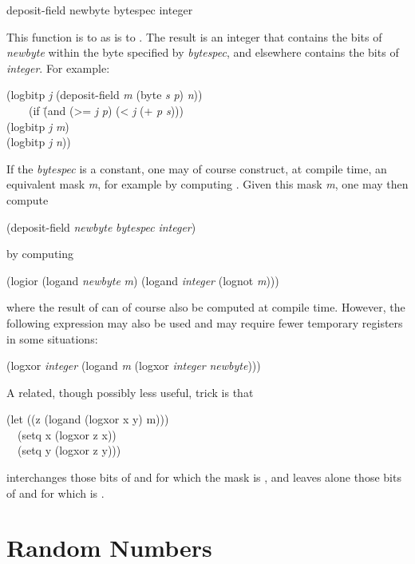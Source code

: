 \begin{defun}[Function]
deposit-field newbyte bytespec integer

This function is to  as  is to .
The result is an integer that contains the bits of {\it newbyte}
within the byte specified by {\it bytespec}, and elsewhere contains the bits
of {\it integer}.
For example:
\begin{lisp}
(logbitp {\it j} (deposit-field {\it m} (byte {\it s} {\it p}) {\it n})) \\
~~~\EQ\ (if \=(and (>= {\it j} {\it p}) (< {\it j} (+ {\it p} {\it s}))) \\
\>(logbitp {\it j} {\it m}) \\
\>(logbitp {\it j} {\it n}))
\end{lisp}

\beforenoterule
\begin{implementation}
If the {\it bytespec} is a constant, one may of course
construct, at compile time, an equivalent mask {\it m}, for example
by computing .  Given
this mask {\it m}, one may then compute
\begin{lisp}
(deposit-field {\it newbyte} {\it bytespec} {\it integer})
\end{lisp}
by computing
\begin{lisp}
(logior (logand {\it newbyte} {\it m}) (logand {\it integer} (lognot {\it m})))
\end{lisp}
where the result of  can of course also be computed
at compile time.  However, the following expression
may also be used and may require fewer
temporary registers in some situations:
\begin{lisp}
(logxor {\it integer} (logand {\it m} (logxor {\it integer} {\it newbyte})))
\end{lisp}
A related, though possibly less useful, trick is that
\begin{lisp}
(let ((z (logand (logxor x y) m))) \\
~~(setq x (logxor z x)) \\
~~(setq y (logxor z y)))
\end{lisp}
interchanges those bits of  and  for which the mask  is
, and leaves alone those bits of  and  for which  is
.
\end{implementation}
\afternoterule
\end{defun}

\section{Random Numbers}
\label{RANDOM}

